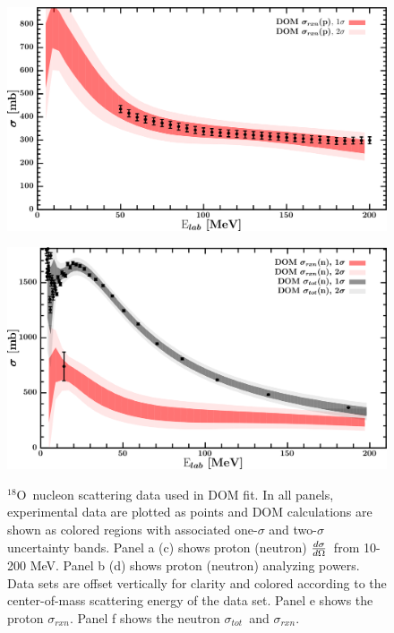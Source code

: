 \documentclass[twocolumn,secnumarabic,amssymb, nobibnotes, aps, prl,
superscriptaddress, nobalancelastpage]{revtex4}
\newcommand{\tot}{\ensuremath{\sigma_{tot}}}
\newcommand{\rxn}{\ensuremath{\sigma_{rxn}}}
\newcommand{\el}{\ensuremath{\frac{\lowercase{d}\sigma}{\lowercase{d}\Omega}}}
\newcommand{\oEight}{\ensuremath{^{18}}O}
\begin{document}
\begin{figure}[!htb]
\begin{minipage}{0.45\textwidth}
        \includegraphics[width=\textwidth]{figures/o18_protonInelastic.png}
        \label{DOM_o18_proton_inelastic}
    \end{minipage}\hspace{6pt}
    \begin{minipage}{0.45\textwidth}
        \centering
        \includegraphics[width=\textwidth]{figures/o18_neutronInelastic.png}
        \label{DOM_o18_neutron_inelastic}
    \end{minipage}
    \caption{\oEight\ nucleon scattering data used in DOM fit. In all panels, experimental data
    are plotted as points and DOM calculations are shown as colored regions with
    associated one-$\sigma$ and two-$\sigma$ uncertainty bands. Panel a (c)
    shows proton (neutron) \el\ from 10-200 MeV. Panel b (d) shows proton
    (neutron) analyzing powers. Data sets are offset vertically for clarity
    and colored according to the center-of-mass scattering energy of the data
    set. Panel e shows the proton \rxn. Panel f shows the neutron \tot\ and
\rxn.}
    \label{DOM_o18_scattering}
\end{figure}
\end{document}
